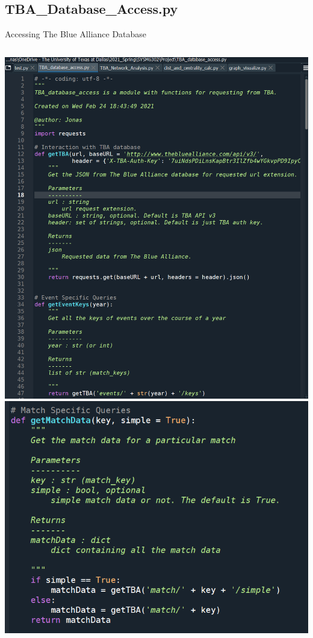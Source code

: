 \documentclass[10pt]{beamer}
\begin{document}
\subsection{TBA\_Database\_Access.py}
\begin{frame}{Accessing The Blue Alliance Database}
	\begin{columns}
			\includegraphics[width=\columnwidth]{Images/tba_database_access_screenshot1}
			\includegraphics[width=\columnwidth]{Images/tba_database_access_screenshot2}\\
	\end{columns}
\end{frame}
\end{document}
